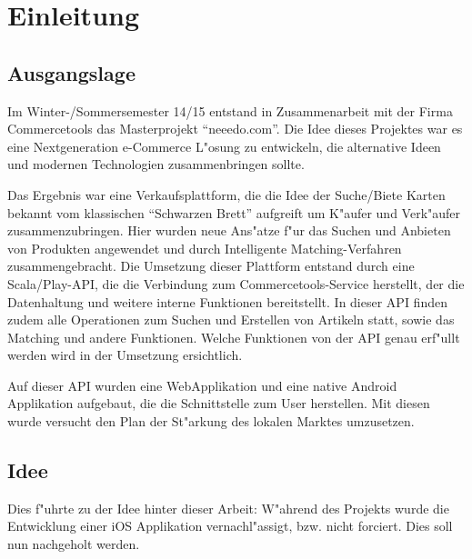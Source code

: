 \documentclass[12pt,a4paper,bibliography=totocnumbered,listof=totocnumbered]{scrartcl}
\begin{document}
\renewcommand{\sectionmark}[1]{\markright{#1}}
\renewcommand{\subsectionmark}[1]{}
\renewcommand{\subsubsectionmark}[1]{}
\rhead{\rightmark}

\onehalfspacing
\renewcommand{\thesection}{\arabic{section}}
\renewcommand{\theHsection}{\arabic{section}}
\setcounter{section}{0}
\setcounter{page}{1}


\section{Einleitung}
\subsection{Ausgangslage}
Im Winter-/Sommersemester 14/15 entstand in Zusammenarbeit mit der Firma Commercetools das Masterprojekt \enquote{neeedo.com}. 
Die Idee dieses Projektes war es eine Nextgeneration e-Commerce L"osung zu entwickeln, die alternative Ideen und modernen Technologien zusammenbringen sollte. 

Das Ergebnis war eine Verkaufsplattform, die die Idee der Suche/Biete Karten bekannt vom klassischen \enquote{Schwarzen Brett} aufgreift um K"aufer und Verk"aufer zusammenzubringen. 
Hier wurden neue Ans"atze f"ur das Suchen und Anbieten von Produkten angewendet und durch Intelligente Matching-Verfahren zusammengebracht.
Die Umsetzung dieser Plattform entstand durch eine Scala/Play-API, die die Verbindung zum Commercetools-Service herstellt, der die Datenhaltung und weitere interne Funktionen bereitstellt. 
In dieser API finden zudem alle Operationen zum Suchen und Erstellen von Artikeln statt, sowie das Matching und andere Funktionen. Welche Funktionen von der API genau erf"ullt werden wird in der Umsetzung ersichtlich.

Auf dieser API wurden eine WebApplikation und eine native Android Applikation aufgebaut, die die Schnittstelle zum User herstellen. 
Mit diesen wurde versucht den Plan der St"arkung des lokalen Marktes umzusetzen. 

\subsection{Idee}
Dies f"uhrte zu der Idee hinter dieser Arbeit: 
W"ahrend des Projekts wurde die Entwicklung einer iOS Applikation vernachl"assigt, bzw. nicht forciert. 
Dies soll nun nachgeholt werden. 
\end{document}
